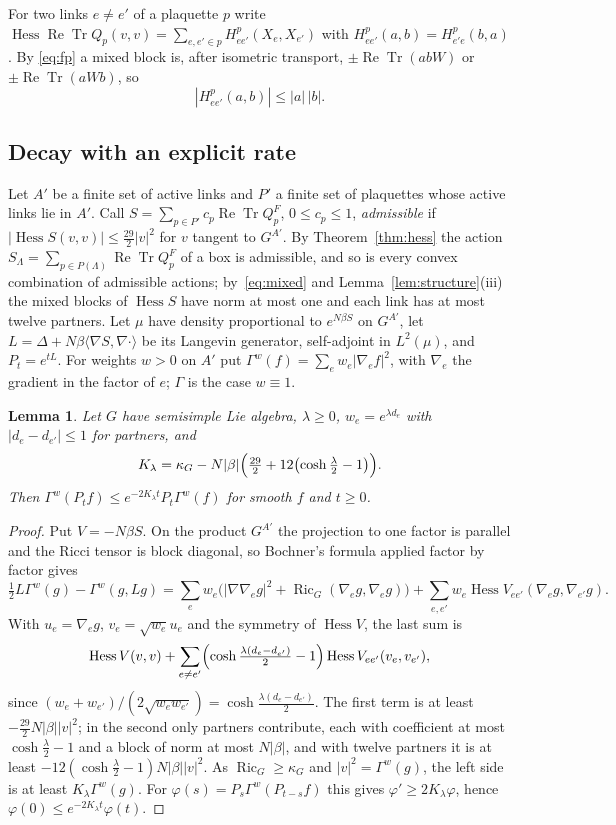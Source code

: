 \documentclass[11pt]{amsart}
\newtheorem{lemma}[theorem]{Lemma}
\theoremstyle{definition}
\theoremstyle{remark}
\numberwithin{equation}{section}
\newcommand{\ReTr}{\operatorname{Re}\operatorname{Tr}}
\newcommand{\Hess}{\operatorname{Hess}}
\newcommand{\Ric}{\operatorname{Ric}}
\newcommand{\ip}[2]{\langle #1,#2\rangle}
\begin{document}
For two links $e\ne e'$ of a plaquette $p$ write $\Hess\ReTr Q_p(v,v)=
\sum_{e,e'\in p}H^p_{ee'}(X_e,X_{e'})$ with $H^p_{ee'}(a,b)=H^p_{e'e}(b,a)$. By
\eqref{eq:fp} a mixed block is, after isometric transport, $\pm\ReTr(abW)$ or
$\pm\ReTr(aWb)$, so
\begin{equation}\label{eq:mixed}
|H^p_{ee'}(a,b)|\le|a|\,|b| .
\end{equation}

\subsection{Decay with an explicit rate}

Let $A'$ be a finite set of active links and $P'$ a finite set of plaquettes
whose active links lie in $A'$. Call $S=\sum_{p\in P'}c_p\ReTr Q^F_p$, $0\le
c_p\le1$, \emph{admissible} if $|\Hess S(v,v)|\le\frac{29}2|v|^2$ for $v$
tangent to $G^{A'}$. By Theorem~\ref{thm:hess} the action $S_\Lambda=\sum_{p\in
P(\Lambda)}\ReTr Q^F_p$ of a box is admissible, and so is every convex combination
of admissible actions; by~\eqref{eq:mixed} and Lemma~\ref{lem:structure}(iii)
the mixed blocks of $\Hess S$ have norm at most one and each link has at most
twelve partners. Let $\mu$ have density proportional to $e^{N\beta S}$ on
$G^{A'}$, let $L=\Delta+N\beta\ip{\nabla S}{\nabla\cdot}$ be its Langevin generator,
self-adjoint in $L^2(\mu)$, and $P_t=e^{tL}$. For weights $w>0$ on $A'$ put
$\Gamma^w(f)=\sum_ew_e|\nabla_ef|^2$, with $\nabla_e$ the gradient in the factor of
$e$; $\Gamma$ is the case $w\equiv1$.

\begin{lemma}\label{lem:weighted}
Let $G$ have semisimple Lie algebra, $\lambda\ge0$, $w_e=e^{\lambda d_e}$ with
$|d_e-d_{e'}|\le1$ for partners, and
\[
K_\lambda=\kappa_G-N|\beta|\Bigl(\tfrac{29}2+12\bigl(\cosh\tfrac\lambda2-1\bigr)\Bigr).
\]
Then $\Gamma^w(P_tf)\le e^{-2K_\lambda t}P_t\Gamma^w(f)$ for smooth $f$ and $t\ge0$.
\end{lemma}

\begin{proof}
Put $V=-N\beta S$. On the product $G^{A'}$ the projection to one factor is
parallel and the Ricci tensor is block diagonal, so Bochner's formula
applied factor by factor gives
\[
\tfrac12L\Gamma^w(g)-\Gamma^w(g,Lg)=\sum_ew_e\bigl(|\nabla\nabla_eg|^2+\Ric_G(\nabla_e
g,\nabla_eg)\bigr)+\sum_{e,e'}w_e\Hess V_{ee'}(\nabla_eg,\nabla_{e'}g).
\]
With $u_e=\nabla_eg$, $v_e=\sqrt{w_e}u_e$ and the symmetry of $\Hess V$, the last
sum is
\[
\Hess V(v,v)+\sum_{e\ne e'}\Bigl(\cosh\tfrac{\lambda(d_e-d_{e'})}2-1\Bigr)\Hess
V_{ee'}(v_e,v_{e'}),
\]
since $(w_e+w_{e'})/(2\sqrt{w_ew_{e'}})=\cosh\frac{\lambda(d_e-d_{e'})}2$. The first
term is at least $-\frac{29}2N|\beta||v|^2$; in the second only partners
contribute, each with coefficient at most $\cosh\frac\lambda2-1$ and a block of
norm at most $N|\beta|$, and with twelve partners it is at least
$-12(\cosh\frac\lambda2-1)N|\beta||v|^2$. As $\Ric_G\ge\kappa_G$ and $|v|^2=
\Gamma^w(g)$, the left side is at least $K_\lambda\Gamma^w(g)$. For
$\varphi(s)=P_s\Gamma^w(P_{t-s}f)$ this gives $\varphi'\ge2K_\lambda\varphi$, hence
$\varphi(0)\le e^{-2K_\lambda t}\varphi(t)$.
\end{proof}
\end{document}
